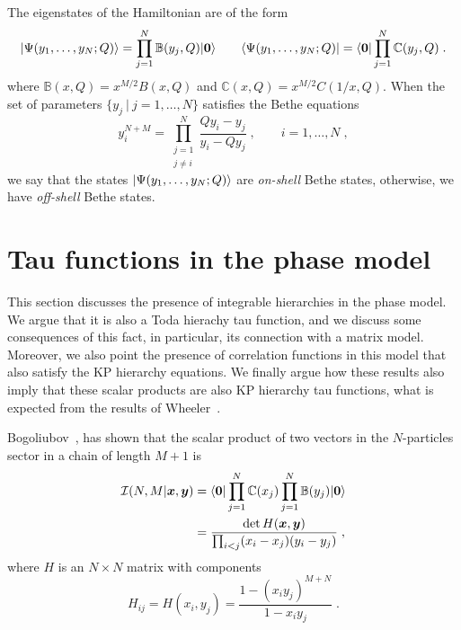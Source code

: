 \documentclass[a4paper,11pt]{amsart}
\begin{document}
The eigenstates of the Hamiltonian are of the form
\begin{equation}
  \lvert\Psi(y_1, \dots, y_N; Q)\rangle = \prod_{j=1}^N \mathbb{B}(y_j, Q) \lvert\bm{0}\rangle\qquad 
  \langle\Psi(y_1, \dots, y_N; Q)\rvert = \langle\bm{0}\rvert\prod_{j=1}^N \mathbb{C}(y_j, Q) \; .
\end{equation}
where \(\mathbb{B}(x, Q) = x^{M/2} B(x, Q)\) and \(\mathbb{C}(x, Q) =
x^{M/2} C(1/x, Q)\).  When the set of parameters \(\{ y_j \ | \ j =1, \dots , N\}\)
satisfies the Bethe equations
\begin{equation}
  y^{N + M}_i =\prod_{\substack{j = 1 \\ j \neq i}}^N\frac{Q y_i - y_j}{y_i - Q y_j}\; , \qquad i = 1, \dots, N\; , 
\end{equation}
we say that the states \(\lvert\Psi(y_1, \dots, y_N; Q)\rangle\) are \emph{on-shell} Bethe states, otherwise, 
we have \emph{off-shell} Bethe states. 


\section{Tau functions in the phase model}

This section discusses the presence of integrable hierarchies in the phase
model.  We argue that it is also a Toda hierachy tau function, and we
discuss some consequences of this fact, in particular, its connection
with a matrix model. Moreover, we also point the presence of
correlation functions in this model that also satisfy the KP hierarchy
equations. We finally argue how these results also imply that these
scalar products are also KP hierarchy tau functions, what is expected from 
the results of Wheeler~\cite{Wheeler:2010vmq}.

Bogoliubov~\cite{Bogoliubov2005}, has shown that the scalar product of
two vectors in the \(N\)-particles sector in a chain of length \(M+1\)
is
\begin{equation}
\begin{split}
\label{eq:scalar}
  \mathcal{I}(N, M|\bm{x}, \bm{y}) & =
  \langle\bm{0}\rvert \prod_{j=1}^N \mathbb{C}(x_j) \prod_{j=1}^N \mathbb{B}(y_j) \lvert\bm{0}\rangle \\ 
 & = \frac{ \det H(\bm{x},\bm{y})}{ \prod_{i<j}(x_i - x_j)(y_i - y_j)} \; ,
\end{split}
\end{equation}
where \(H\) is an \(N\times N\) matrix with components
\begin{equation}
\label{eq:h-matrix}
  H_{ij} = H(x_i, y_j) 
  =\frac{1 - (x_i y_j)^{ M + N}}{1 - x_i y_j }\; .
\end{equation}
\end{document}
